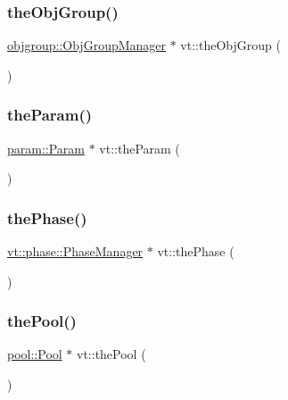 \mbox{\label{namespacevt_a833f0115b692f578167cbd88e30d39c5}} 
\subsubsection{\texorpdfstring{the\+Obj\+Group()}{theObjGroup()}}
{\footnotesize\ttfamily \hyperlink{structvt_1_1objgroup_1_1_obj_group_manager}{objgroup\+::\+Obj\+Group\+Manager} $\ast$ vt\+::the\+Obj\+Group (\begin{DoxyParamCaption}{ }\end{DoxyParamCaption})}

\mbox{\label{namespacevt_a268431014c9031c0f7c33d32c1b8645c}} 
\subsubsection{\texorpdfstring{the\+Param()}{theParam()}}
{\footnotesize\ttfamily \hyperlink{structvt_1_1param_1_1_param}{param\+::\+Param} $\ast$ vt\+::the\+Param (\begin{DoxyParamCaption}{ }\end{DoxyParamCaption})}

\mbox{\label{namespacevt_a3799d6b51fb71d7b6505760aad457e61}} 
\subsubsection{\texorpdfstring{the\+Phase()}{thePhase()}}
{\footnotesize\ttfamily \hyperlink{structvt_1_1phase_1_1_phase_manager}{vt\+::phase\+::\+Phase\+Manager} $\ast$ vt\+::the\+Phase (\begin{DoxyParamCaption}{ }\end{DoxyParamCaption})}

\mbox{\label{namespacevt_aab3530d89a64e5ea903b0ccf303ecbb7}} 
\subsubsection{\texorpdfstring{the\+Pool()}{thePool()}}
{\footnotesize\ttfamily \hyperlink{structvt_1_1pool_1_1_pool}{pool\+::\+Pool} $\ast$ vt\+::the\+Pool (\begin{DoxyParamCaption}{ }\end{DoxyParamCaption})}

